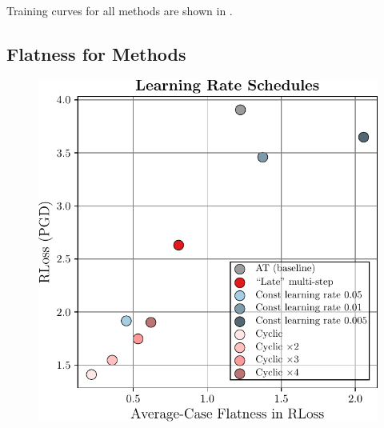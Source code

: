Training curves for all methods are shown in .

\subsection{Flatness for Methods}
\label{sec:supp-methods-flatness}

\begin{figure}[t]
\begin{minipage}{\textwidth}
	\centering
	\vspace*{-0.2cm}
	\hspace*{-0.4cm}
	\begin{minipage}[t]{0.18\textwidth}
		\vspace*{0px}
		
		\includegraphics[width=\textwidth]{plots_supp_flatness_correlation_seq_loss_methods_lr}
	\end{minipage}
	\begin{minipage}[t]{0.18\textwidth}
		\vspace*{0px}
				

\end{minipage}
\end{minipage}
\end{figure}
